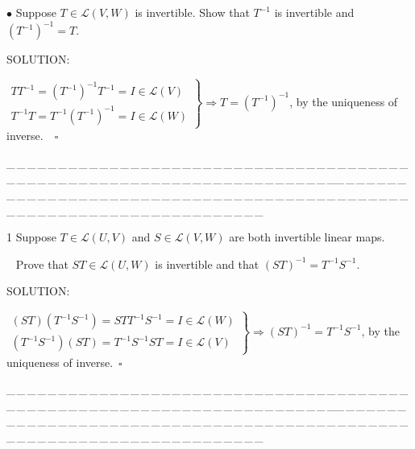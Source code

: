 \documentclass[a4paper, 11pt, UTF8]{article}
\def\Lm{\mathcal{L}}
\begin{document}
\begin{large}
{\small $\bullet$} {\timessl\Large 
Suppose $T\in\Lm(V, W)$ is invertible. Show that $T^{-1}$ is invertible and $(T^{-1})^{-1}=T$.
}\par
{\timesbf S\footnotesize{OLUTION:}}\par\quad
$\left.\begin{array}{l}
TT^{-1}=(T^{-1})^{-1}T^{-1}=I\in\Lm(V)\\
T^{-1}T=T^{-1}(T^{-1})^{-1}=I\in\Lm(W)
\end{array}\right\}\Rightarrow T=(T^{-1})^{-1}$, by the uniqueness of inverse$.\quad\square$
\par
{\tiny \_\,\_\,\_\,\_\,\_\,\_\,\_\,\_\,\_\,\_\,\_\,\_\,\_\,\_\,\_\,\_\,\_\,\_\,\_\,\_\,\_\,\_\,\_\,\_\,\_\,\_\,\_\,\_\,\_\,\_\,\_\,\_\,\_\,\_\,\_\,\_\,\_\,\_\,\_\,\_\,\_\,\_\,\_\,\_\,\_\,\_\,\_\,\_\,\_\,\_\,\_\,\_\,\_\,\_\,\_\,\_\,\_\,\_\,\_\,\_\,\_\,\_\,\_\,\_\,\_\,\_\,\_\,\_\,\_\,\_\,\_\_\,\_\,\_\,\_\,\_\,\_\,\_\,\_\,\_\,\_\,\_\,\_\,\_\,\_\,\_\,\_\,\_\,\_\,\_\,\_\,\_\,\_\,\_\,\_\,\_\,\_\,\_\,\_\,\_\,\_\,\_\,\_\,\_\,\_\,\_\,\_\,\_\,\_\,\_\,\_\,\_\,\_\,\_\,\_\,\_\,\_\,\_\,\_\,\_\,\_\,\_\,\_\,\_\,\_\,\_\,\_\,\_\,\_\,\_\,\_\,\_\,\_\,\_\,\_\,\_\,\_\,\_\,\_\,\_\,\_\,\_}\par

{\timesbf\Large 1} {\timessl\Large 
Suppose $T\in\Lm(U,V)$ and $S\in\Lm(V,W)$ are both invertible linear maps.}\par\,\,\,
{\timessl\Large Prove that $ST\in\Lm(U, W)$ is invertible and that $(ST)^{-1} = T^{-1}S^{-1}$.
}\par
{\timesbf S\footnotesize{OLUTION:}}\par\quad
$\left.\begin{array}{l}
(ST)(T^{-1}S^{-1})=STT^{-1}S^{-1}=I\in\Lm(W)\\
(T^{-1}S^{-1})(ST)=T^{-1}S^{-1}ST=I\in\Lm(V)
\end{array}\right\}\Rightarrow (ST)^{-1} = T^{-1}S^{-1}$, by the uniqueness of inverse$.\,\,\,\square$\par
{\tiny \_\,\_\,\_\,\_\,\_\,\_\,\_\,\_\,\_\,\_\,\_\,\_\,\_\,\_\,\_\,\_\,\_\,\_\,\_\,\_\,\_\,\_\,\_\,\_\,\_\,\_\,\_\,\_\,\_\,\_\,\_\,\_\,\_\,\_\,\_\,\_\,\_\,\_\,\_\,\_\,\_\,\_\,\_\,\_\,\_\,\_\,\_\,\_\,\_\,\_\,\_\,\_\,\_\,\_\,\_\,\_\,\_\,\_\,\_\,\_\,\_\,\_\,\_\,\_\,\_\,\_\,\_\,\_\,\_\,\_\,\_\_\,\_\,\_\,\_\,\_\,\_\,\_\,\_\,\_\,\_\,\_\,\_\,\_\,\_\,\_\,\_\,\_\,\_\,\_\,\_\,\_\,\_\,\_\,\_\,\_\,\_\,\_\,\_\,\_\,\_\,\_\,\_\,\_\,\_\,\_\,\_\,\_\,\_\,\_\,\_\,\_\,\_\,\_\,\_\,\_\,\_\,\_\,\_\,\_\,\_\,\_\,\_\,\_\,\_\,\_\,\_\,\_\,\_\,\_\,\_\,\_\,\_\,\_\,\_\,\_\,\_\,\_\,\_\,\_\,\_\,\_}\par


\end{large}
\end{document}
